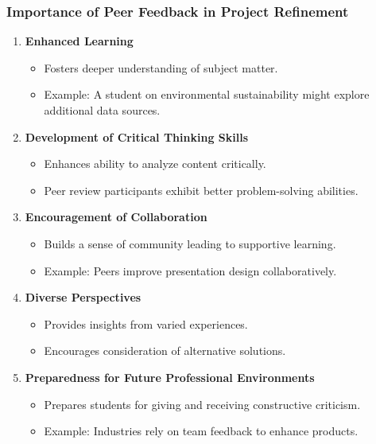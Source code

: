 \documentclass[aspectratio=169]{beamer}
\begin{document}
\begin{frame}[fragile]
    \frametitle{Importance of Peer Feedback in Project Refinement}
    \begin{enumerate}
        \item \textbf{Enhanced Learning} 
        \begin{itemize}
            \item Fosters deeper understanding of subject matter.
            \item Example: A student on environmental sustainability might explore additional data sources.
        \end{itemize}
        
        \item \textbf{Development of Critical Thinking Skills} 
        \begin{itemize}
            \item Enhances ability to analyze content critically.
            \item Peer review participants exhibit better problem-solving abilities.
        \end{itemize}
        
        \item \textbf{Encouragement of Collaboration} 
        \begin{itemize}
            \item Builds a sense of community leading to supportive learning.
            \item Example: Peers improve presentation design collaboratively.
        \end{itemize}
        
        \item \textbf{Diverse Perspectives} 
        \begin{itemize}
            \item Provides insights from varied experiences.
            \item Encourages consideration of alternative solutions.
        \end{itemize}
        
        \item \textbf{Preparedness for Future Professional Environments} 
        \begin{itemize}
            \item Prepares students for giving and receiving constructive criticism.
            \item Example: Industries rely on team feedback to enhance products.
        \end{itemize}
    \end{enumerate}
\end{frame}
\end{document}
